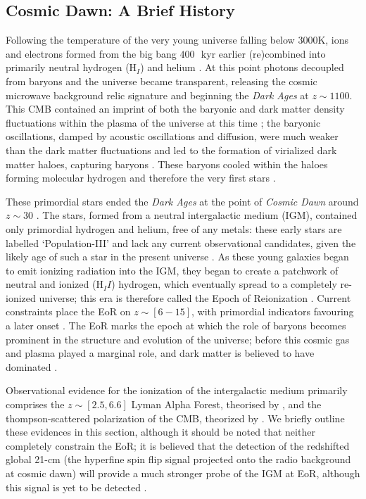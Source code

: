 \documentclass[fleqn,usenatbib]{mnras}
\begin{document}
\subsection{Cosmic Dawn: A Brief History}
Following the temperature of the very young universe falling below 3000K, ions and electrons formed from the big bang $400\,$~kyr earlier (re)combined into primarily neutral hydrogen (H$_I$) and helium \citep{Barkana_2001}. At this point photons decoupled from baryons and the universe became transparent, releasing the cosmic microwave background relic signature and beginning the \textit{Dark Ages} at $z\sim1100$. This CMB contained an imprint of both the baryonic and dark matter density fluctuations within the plasma of the universe at this time \citep{smoot_1992}; the baryonic oscillations, damped by acoustic oscillations and diffusion, were much weaker than the dark matter fluctuations and led to the formation of virialized dark matter haloes, capturing baryons \citep{tacchella_2025,Tacchella_2018}. These baryons cooled within the haloes forming molecular hydrogen and therefore the very first stars \citep{bromm_2004}.

These primordial stars ended the \textit{Dark Ages} at the point of \textit{Cosmic Dawn} around $z\sim30$ \citep{tacchella_2025}. The stars, formed from a neutral intergalactic medium (IGM), contained only primordial hydrogen and helium, free of any metals: these early stars are labelled `Population-III' and lack any current observational candidates, given the likely age of such a star in the present universe \citep{klessen}. As these young galaxies began to emit ionizing radiation into the IGM, they began to create a patchwork of neutral and ionized (H$_II$) hydrogen, which eventually spread to a completely re-ionized universe; this era is therefore called the Epoch of Reionization \citep{Ciardi_2005, Morales_2010}. Current constraints place the EoR on $z\sim[6-15]$, with primordial indicators favouring a later onset \citep{planck_2016}. The EoR marks the 
epoch at which the role of baryons becomes prominent in the structure and evolution of the universe; before this cosmic gas and plasma played a marginal role, and dark matter is believed to have dominated \citep{zaroubi}.

Observational evidence for the ionization of the intergalactic medium primarily comprises the $z\sim[2.5,6.6]$ Lyman Alpha Forest, theorised by \cite{gunn_1965}, and the thompson-scattered polarization of the CMB, theorized by \cite{peebles_1970}. We briefly outline these evidences in this section, although it should be noted that neither completely constrain the EoR; it is believed that the detection of the redshifted global 21-cm (the hyperfine spin flip signal projected onto the radio background at cosmic dawn) will provide a much stronger probe of the IGM at EoR, although this signal is yet to be detected \citep{hogan_1979,scott_1990,fialkov_2013,Bevins_2022,Abdurashidova_2022,dhanda_2025}.
\end{document}
